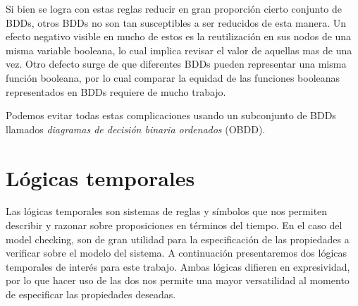 \documentclass[titlepage, 12pt]{book}
\begin{document}
Si bien se logra con estas reglas reducir en gran proporción cierto conjunto de BDDs, otros BDDs no son tan susceptibles a ser reducidos de esta manera. Un efecto negativo visible en mucho de estos es la reutilización en sus nodos de una misma variable booleana, lo cual implica revisar el valor de aquellas mas de una vez. Otro defecto surge de que diferentes BDDs pueden representar una misma función booleana, por lo cual comparar la equidad de las funciones booleanas representados en BDDs requiere de mucho trabajo.

Podemos evitar todas estas complicaciones usando un subconjunto de BDDs llamados \textit{diagramas de decisión binaria ordenados} (OBDD).







\section{L\'ogicas temporales}
Las l\'ogicas temporales son sistemas de reglas y s\'imbolos que nos permiten describir y razonar sobre proposiciones en t\'erminos del tiempo. En el caso del model checking, son de gran utilidad para la especificaci\'on de las propiedades a verificar sobre el modelo del sistema. A continuaci\'on presentaremos dos l\'ogicas temporales de inter\'es para este trabajo. Ambas l\'ogicas difieren en expresividad, por lo que hacer uso de las dos nos permite una mayor versatilidad al momento de especificar las propiedades deseadas.\\
\end{document}
